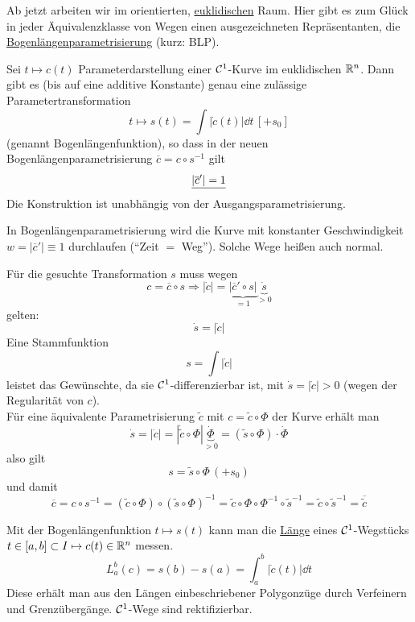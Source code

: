Ab jetzt arbeiten wir im orientierten, \uline{euklidischen} Raum. Hier gibt es zum Glück in jeder Äqui\-va\-lenzklasse von Wegen einen ausgezeichneten Repräsentanten, die \uline{Bogenlängenparametrisierung} (kurz: BLP).

\begin{satz}\label{satz113}
 Sei \(t \mapsto c(t)\) Parameterdarstellung einer \(\mathcal{C}^1\)-Kurve im euklidischen \(\mathbb{R}^n\). Dann gibt es (bis auf eine additive Konstante) genau eine zulässige Parametertransformation 
 \[
  t \mapsto s(t) = \int|\dot c (t)| \dd t \, [+ s_0]
 \]
 (genannt Bogenlängenfunktion), so dass in der neuen Bogenlängenparametrisierung
 \(
  \overline c = c \circ s^{-1}
 \)
 gilt
 \[
 \uline{|\overline c' | = 1}
 \]
 Die Konstruktion ist unabhängig von der Ausgangsparametrisierung.
\end{satz}

\begin{kin}
In Bogenlängenparametrisierung wird die Kurve mit konstanter Geschwindigkeit \(w = |\overline c'| \equiv 1\) durchlaufen ("`Zeit \(=\) Weg"'). Solche Wege heißen auch normal.
\end{kin}

\begin{beweis}
 Für die gesuchte Transformation \(s\) muss wegen 
 \[
 c = \overline c \circ s \Rightarrow |\dot c| = \underbrace{|\overline c' \circ s|}_{= 1} \underbrace{\dot s}_{> 0}
 \]
 gelten: 
 \[
 \dot s = |\dot c|
 \]
Eine Stammfunktion 
 \[
 s = \int |\dot c|
 \]
leistet das Gewünschte, da sie \(\mathcal{C}^1\)-differenzierbar ist, mit 
\(
\dot s = |\dot c| > 0
\)
(wegen der Regularität von \(c\)). \\
 Für eine äquivalente Parametrisierung \(\widetilde c\) mit \(c = \widetilde c \circ \Phi\) der Kurve erhält man
 \[
  \dot s = |\dot c| = |\dot{\widetilde c} \circ \Phi| \underbrace{\dot \Phi}_{> 0} = (\widetilde s \circ \Phi) \cdot \dot \Phi
 \]
 also gilt 
 \[s = \widetilde s \circ \Phi \, (+ s_0)\] 
 und damit \[\overline c = c \circ s^{-1} = (\widetilde c \circ \Phi) \circ (\widetilde s \circ \Phi)^{-1} = \widetilde c \circ \Phi \circ \Phi^{-1} \circ \widetilde s^{-1} = \widetilde c \circ \widetilde s^{-1} = \overline{\widetilde c}\]
\end{beweis}

\begin{bemerkung}
 Mit der Bogenlängenfunktion \(t \mapsto s(t)\) kann man die \uline{Länge} eines \(\mathcal{C}^1\)-Wegstücks \\
 \(t \in [a,b] \subset I \mapsto c(t) \in \mathbb{R}^n\) messen.
 \[
  L_a^b(c) = s(b) - s(a) = \int_a^b |\dot c(t)| \dd t
 \]
 Diese erhält man aus den Längen einbeschriebener Polygonzüge durch Verfeinern und Grenzüber\-gänge. \(\mathcal{C}^1\)-Wege sind rektifizierbar.
\end{bemerkung}


